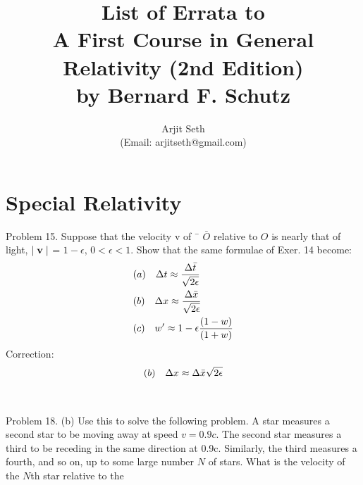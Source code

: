 \documentclass{report}
\theoremstyle{definition}
\begin{document}
\title{List of Errata to \\A First Course in General Relativity (2nd Edition)\\ by Bernard F. Schutz}

\author{Arjit Seth \\(Email: arjitseth@gmail.com)}

\maketitle

\chapter{Special Relativity}

Problem 15.
Suppose that the velocity v of
¯
$\bar{O}$ relative to $O$ is nearly that of light, $\mid{\bf v}\mid$ = $1-\epsilon$,
$0<\epsilon<1$. Show that the same formulae of Exer. 14 become:
\begin{equation}
\begin{split}
\begin{aligned}
	&(a)\hspace{10 pt} \Delta{t} \approx \frac{\Delta{\bar{t}}}{\sqrt{2\epsilon}} \\
	&(b)\hspace{10 pt} \Delta{x} \approx \frac{\Delta{\bar{x}}}{\sqrt{2\epsilon}} \\
	&(c)\hspace{10 pt} w' \approx 1-\epsilon\frac{(1-w)}{(1+w)}
\end{aligned}
\end{split}
\end{equation}
Correction:
\begin{equation}
\begin{split}
\begin{aligned}
	&(b)\hspace{10 pt} \Delta{x} \approx \Delta{\bar{x}}{\sqrt{2\epsilon}} \\
\end{aligned}
\end{split}
\end{equation} \\\\
Problem 18.
(b) Use this to solve the following problem. A star measures a second star to be moving
away at speed $v = 0.9c$. The second star measures a third to be receding in the
same direction at 0.9c. Similarly, the third measures a fourth, and so on, up to
some large number $N$ of stars. What is the velocity of the $N$th star relative to the
\end{document}

